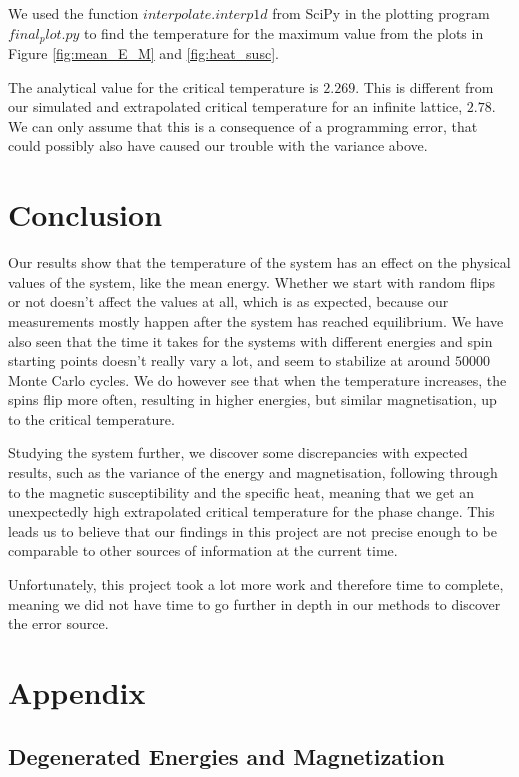 \documentclass{article}
\begin{document}
{{{	We used the function $interpolate.interp1d$ from SciPy in the plotting program $final_ plot.py$ to find the temperature for the maximum value from the plots in Figure \ref{fig:mean_E_M} and \ref{fig:heat_susc}.

	The analytical value for the critical temperature is $2.269$. This is different from our simulated and extrapolated critical temperature for an infinite lattice, $2.78$. We can only assume that this is a consequence of a programming error, that could possibly also have caused our trouble with the variance above.

\section{Conclusion}
	Our results show that the temperature of the system has an effect on the physical values of the system, like the mean energy. Whether we start with random flips or not doesn't affect the values at all, which is as expected, because our measurements mostly happen after the system has reached equilibrium. We have also seen that the time it takes for the systems with different energies and spin starting points doesn't really vary a lot, and seem to stabilize at around $50 000$ Monte Carlo cycles. We do however see that when the temperature increases, the spins flip more often, resulting in higher energies, but similar magnetisation, up to the critical temperature.

	Studying the system further, we discover some discrepancies with expected results, such as the variance of the energy and magnetisation, following through to the magnetic susceptibility and the specific heat, meaning that we get an unexpectedly high extrapolated critical temperature for the phase change. This leads us to believe that our findings in this project are not precise enough to be comparable to other sources of information at the current time.

	Unfortunately, this project took a lot more work and therefore time to complete, meaning we did not have time to go further in depth in our methods to discover the error source.


\section{Appendix}
	\subsection{Degenerated Energies and Magnetization}

}}}
\end{document}
